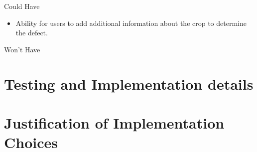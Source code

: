 \item Could Have
\begin{itemize}
  \item Ability for users to add additional information about the crop
    to determine the defect.
\end{itemize}
\item Won't Have
\section{Testing and Implementation details}

\section{Justification of Implementation Choices}
